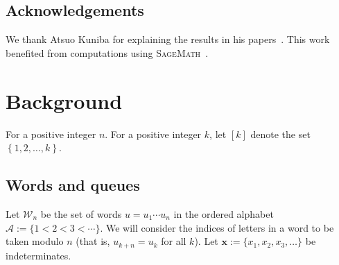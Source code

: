 \documentclass[reqno]{amsart}
\newcommand{\0}{\phantom{c}}
\newcommand{\xx}{\mathbf{x}}
\newcommand{\mcA}{\mathcal{A}}
\newcommand{\mcW}{\mathcal{W}}
\newcommand{\set}[1]{\left\{ #1 \right\}}
\newcommand{\ive}[1]{\left[ #1 \right]}
\theoremstyle{plain}
\theoremstyle{definition}
\numberwithin{equation}{section}
\newcommand{\Erik}[1]{\todo[size=\tiny,inline,color=green!30]{#1
      \\ \hfill --- Erik}}
\newcommand{\darij}[1]{\todo[size=\tiny,color=red!30]{#1 \\ \hfill --- Darij}}
\begin{document}
%


\subsection{Acknowledgements}

We thank Atsuo Kuniba for explaining the results in his papers~\cite{KMO16II,KMO15,KMO16,KMO16TARZP,KMO16TARZPII}.
This work benefited from computations using \textsc{SageMath}~\cite{sage,combinat}.









\section{Background}
\label{sec:background}

For a positive integer $n$. For a positive integer $k$, let $\ive{k}$ denote the set $\set{1, 2, \ldots, k}$.

\subsection{Words and queues}

Let $\mcW_n$ be the set of words $u = u_1 \dotsm u_n$ in the ordered alphabet $\mcA := \{1 < 2 < 3 < \cdots \}$.
We will consider the indices of letters in a word to be taken modulo $n$ (that is, $u_{k+n} = u_k$ for all $k$).
Let $\xx := \{x_1, x_2, x_3, \ldots\}$ be indeterminates.
\end{document}
